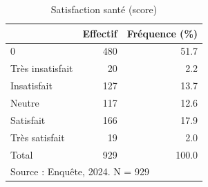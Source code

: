 \begin{table}[htbp]\centering
\def\sym#1{\ifmmode^{#1}\else\(^{#1}\)\fi}
\caption{Satisfaction santé (score)}
\begin{tabular}{l*{2}{r}}
\toprule
            &    Effectif&Fréquence (\%)\\
\midrule
0           &         480&        51.7\\
Très insatisfait&          20&         2.2\\
Insatisfait &         127&        13.7\\
Neutre      &         117&        12.6\\
Satisfait   &         166&        17.9\\
Très satisfait&          19&         2.0\\
Total       &         929&       100.0\\
\bottomrule
\multicolumn{3}{l}{\footnotesize Source : Enquête, 2024. N = 929}\\
\end{tabular}
\end{table}
